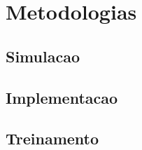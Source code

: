 \chapter{Metodologias}

\lipsum[1]

\section{Simulacao}

\lipsum[2-3]

\section{Implementacao}

\lipsum[4-6]

\section{Treinamento}

\lipsum[7-8]

